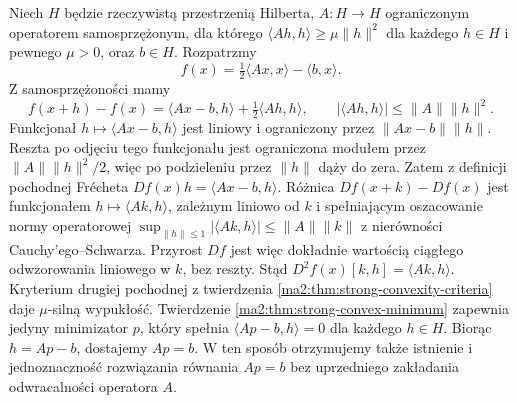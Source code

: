 \begin{przyklad}
\label{ma2:ex:strong-convex-quadratic}
Niech $H$ będzie rzeczywistą przestrzenią Hilberta,
$A:H\to H$ ograniczonym operatorem samosprzężonym,
dla którego $\langle Ah,h\rangle\ge\mu\|h\|^2$
dla każdego $h\in H$ i pewnego $\mu>0$, oraz $b\in H$.
Rozpatrzmy
\[
 f(x)=\tfrac12\langle Ax,x\rangle-\langle b,x\rangle .
\]
Z samosprzężoności mamy
\[
 f(x+h)-f(x)=\langle Ax-b,h\rangle+\tfrac12\langle Ah,h\rangle,
 \qquad |\langle Ah,h\rangle|\le\|A\|\|h\|^2 .
\]
Funkcjonał $h\mapsto\langle Ax-b,h\rangle$ jest liniowy
i ograniczony przez $\|Ax-b\|\|h\|$.
Reszta po odjęciu tego funkcjonału jest ograniczona
modułem przez $\|A\|\|h\|^2/2$, więc po podzieleniu
przez $\|h\|$ dąży do zera. Zatem z definicji
pochodnej Frécheta $Df(x)h=\langle Ax-b,h\rangle$.
Różnica $Df(x+k)-Df(x)$ jest funkcjonałem
$h\mapsto\langle Ak,h\rangle$, zależnym liniowo
od $k$ i spełniającym oszacowanie normy operatorowej
$\sup_{\|h\|\le1}|\langle Ak,h\rangle|\le\|A\|\|k\|$
z nierówności Cauchy'ego--Schwarza.
Przyrost $Df$ jest więc dokładnie wartością
ciągłego odwzorowania liniowego w $k$, bez reszty.
Stąd
$D^2f(x)[k,h]=\langle Ak,h\rangle$.
Kryterium drugiej pochodnej z twierdzenia
\ref{ma2:thm:strong-convexity-criteria} daje
$\mu$-silną wypukłość.
Twierdzenie \ref{ma2:thm:strong-convex-minimum}
zapewnia jedyny minimizator $p$, który spełnia
$\langle Ap-b,h\rangle=0$ dla każdego $h\in H$.
Biorąc $h=Ap-b$, dostajemy $Ap=b$.
W ten sposób otrzymujemy także istnienie i jednoznaczność
rozwiązania równania $Ap=b$ bez uprzedniego zakładania
odwracalności operatora $A$.
\end{przyklad}
